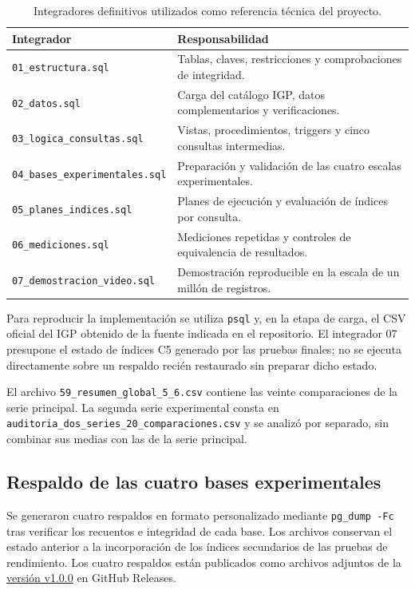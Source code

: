 \documentclass[12pt,a4paper]{article}
\begin{document}
\begin{table}[H]
\centering\small
\begin{tabular}{>{\raggedright\arraybackslash}p{6.0cm}>{\raggedright\arraybackslash}p{7.1cm}}
\toprule
\textbf{Integrador} & \textbf{Responsabilidad} \\
\midrule
\nolinkurl{01_estructura.sql} & Tablas, claves, restricciones y comprobaciones de integridad. \\
\nolinkurl{02_datos.sql} & Carga del catálogo IGP, datos complementarios y verificaciones. \\
\nolinkurl{03_logica_consultas.sql} & Vistas, procedimientos, triggers y cinco consultas intermedias. \\
\nolinkurl{04_bases_experimentales.sql} & Preparación y validación de las cuatro escalas experimentales. \\
\nolinkurl{05_planes_indices.sql} & Planes de ejecución y evaluación de índices por consulta. \\
\nolinkurl{06_mediciones.sql} & Mediciones repetidas y controles de equivalencia de resultados. \\
\nolinkurl{07_demostracion_video.sql} & Demostración reproducible en la escala de un millón de registros. \\
\bottomrule
\end{tabular}

\caption{Integradores definitivos utilizados como referencia técnica del proyecto.}
\label{tab:integradores-definitivos}
\end{table}

Para reproducir la implementación se utiliza \texttt{psql} y, en la
etapa de carga, el CSV oficial del IGP obtenido de la fuente indicada
en el repositorio. El integrador 07 presupone el estado de índices
C5 generado por las pruebas finales; no se ejecuta directamente
sobre un respaldo recién restaurado sin preparar dicho estado.

El archivo \nolinkurl{59_resumen_global_5_6.csv} contiene las
veinte comparaciones de la serie principal. La segunda serie
experimental consta en \nolinkurl{auditoria_dos_series_20_comparaciones.csv}
y se analizó por separado, sin combinar sus medias con las de la
serie principal.

\subsection{Respaldo de las cuatro bases experimentales}

Se generaron cuatro respaldos en formato personalizado mediante
\texttt{pg\_dump -Fc} tras verificar los recuentos
e integridad de cada base. Los archivos conservan el estado anterior a
la incorporación de los índices secundarios de las pruebas de rendimiento.
Los cuatro respaldos están publicados como archivos adjuntos
de la \href{https://github.com/FabricioNick/Sistema-Monitoreo-Sismologico/releases/tag/v1.0.0}{versión v1.0.0}
en GitHub Releases.
\end{document}
